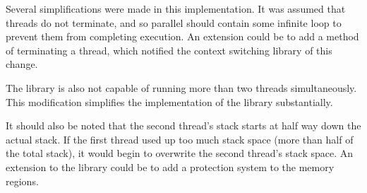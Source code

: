 \documentclass[twoside,a4paper]{article}
\begin{document}
Several simplifications were made in this implementation. It was assumed that threads do not terminate, and so parallel should contain some infinite loop to prevent them from completing execution. An extension could be to add a method of terminating a thread, which notified the context switching library of this change.

The library is also not capable of running more than two threads simultaneously. This modification simplifies the implementation of the library substantially.

It should also be noted that the second thread's stack starts at half way down the actual stack. If the first thread used up too much stack space (more than half of the total stack), it would begin to overwrite the second thread's stack space. An extension to the library could be to add a protection system to the memory regions.
\end{document}
